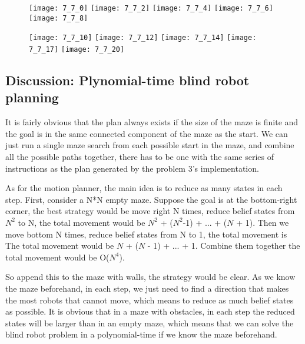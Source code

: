 \documentclass{article}
\begin{document}
\begin{figure}[!htb]

  \texttt{[image: 7\_7\_0]}
\endminipage\hfill
{}
  \texttt{[image: 7\_7\_2]}
\endminipage\hfill
{}
  \texttt{[image: 7\_7\_4]}
\endminipage
{}
  \texttt{[image: 7\_7\_6]}
\endminipage
{}
  \texttt{[image: 7\_7\_8]}
\endminipage
\end{figure}

\begin{figure}[!htb]

  \texttt{[image: 7\_7\_10]}
\endminipage\hfill
{}
  \texttt{[image: 7\_7\_12]}
\endminipage\hfill
{}
  \texttt{[image: 7\_7\_14]}
\endminipage
{}
  \texttt{[image: 7\_7\_17]}
\endminipage
{}
  \texttt{[image: 7\_7\_20]}
\endminipage
\end{figure}


\subsection{Discussion: Plynomial-time blind robot planning}
\begin{flushleft}
It is fairly obvious that the plan always exists if the size of the maze is finite and the goal is in the same connected component of the maze as the start. We can just run a single maze search from each possible start in the maze, and combine all the possible paths together, there has to be one with the same series of instructions as the plan generated by the problem 3's implementation.

As for the motion planner, the main idea is to reduce as many states in each step. First, consider a N*N empty maze. Suppose the goal is at the bottom-right corner, the best strategy would be move right N times, reduce belief states from $N^2$ to N, the total movement would be $N^2$ + ($N^2$-1) + ... + ($N$ + 1). Then we move bottom N times, reduce belief states from N to 1, the total movement is  The total movement would be $N$ + ($N$ - 1) + ... + 1. Combine them together the total movement would be O($N^4$).

So append this to the maze with walls, the strategy would be clear. As we know the maze beforehand, in each step, we just need to find a direction that makes the most robots that cannot move, which means to reduce as much belief states as possible. It is obvious that in a maze with obstacles, in each step the reduced states will be larger than in an empty maze, which means that we can solve the blind robot problem in a polynomial-time if we know the maze beforehand.
\end{flushleft}
\end{document}
